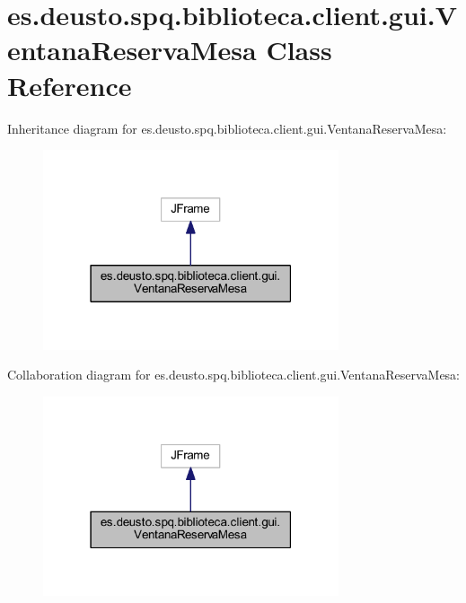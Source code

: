 \hypertarget{classes_1_1deusto_1_1spq_1_1biblioteca_1_1client_1_1gui_1_1_ventana_reserva_mesa}{}\section{es.\+deusto.\+spq.\+biblioteca.\+client.\+gui.\+Ventana\+Reserva\+Mesa Class Reference}
\label{classes_1_1deusto_1_1spq_1_1biblioteca_1_1client_1_1gui_1_1_ventana_reserva_mesa}


Inheritance diagram for es.\+deusto.\+spq.\+biblioteca.\+client.\+gui.\+Ventana\+Reserva\+Mesa\+:
\nopagebreak
\begin{figure}[H]
\begin{center}
\leavevmode
\includegraphics[width=247pt]{classes_1_1deusto_1_1spq_1_1biblioteca_1_1client_1_1gui_1_1_ventana_reserva_mesa__inherit__graph}
\end{center}
\end{figure}


Collaboration diagram for es.\+deusto.\+spq.\+biblioteca.\+client.\+gui.\+Ventana\+Reserva\+Mesa\+:
\nopagebreak
\begin{figure}[H]
\begin{center}
\leavevmode
\includegraphics[width=247pt]{classes_1_1deusto_1_1spq_1_1biblioteca_1_1client_1_1gui_1_1_ventana_reserva_mesa__coll__graph}
\end{center}
\end{figure}
